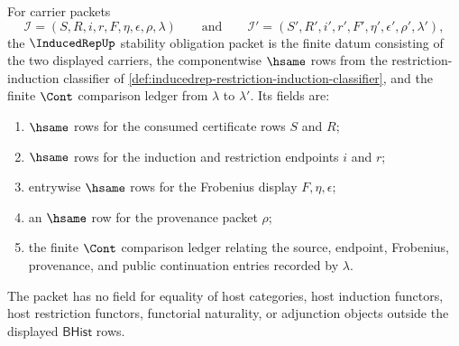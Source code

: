 \begin{definition}
\label{def:inducedrep-stability-obligation-packet}
For carrier packets
$$
\mathcal{I}=(S,R,i,r,F,\eta,\epsilon,\rho,\lambda)
\qquad\text{and}\qquad
\mathcal{I}'=(S',R',i',r',F',\eta',\epsilon',\rho',\lambda'),
$$
the $\InducedRepUp$ stability obligation packet is the finite datum
consisting of the two displayed carriers, the componentwise $\hsame$ rows
from the restriction-induction classifier of
\autoref{def:inducedrep-restriction-induction-classifier}, and the finite
$\Cont$ comparison ledger from $\lambda$ to $\lambda'$. Its fields are:
\begin{enumerate}
  \item $\hsame$ rows for the consumed certificate rows $S$ and $R$;
  \item $\hsame$ rows for the induction and restriction endpoints $i$ and
  $r$;
  \item entrywise $\hsame$ rows for the Frobenius display
  $F,\eta,\epsilon$;
  \item an $\hsame$ row for the provenance packet $\rho$;
  \item the finite $\Cont$ comparison ledger relating the source,
  endpoint, Frobenius, provenance, and public continuation entries recorded
  by $\lambda$.
\end{enumerate}
The packet has no field for equality of host categories, host induction
functors, host restriction functors, functorial naturality, or adjunction
objects outside the displayed $\mathsf{BHist}$ rows.
\end{definition}

